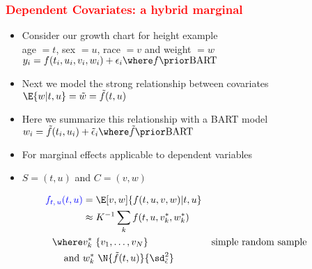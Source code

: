 \documentclass[11pt,dvipsnames,usenames,times]{beamer}
\newcommand*{\BART}{\mathrm{BART}\ }
\newcommand*{\red}[1]{\textcolor{red}{#1}}%
\begin{document}
\begin{frame}\frametitle{\bf%
\textcolor{red}{Dependent Covariates: a hybrid marginal}}

\begin{itemize}
\item Consider our growth chart for height example\\
age $=t$, sex $=u$, race $=v$ and weight $=w$\\
$y_i = f(t_i, u_i, v_i, w_i) + \epsilon_i \where f \prior \BART$
\item Next we model the strong relationship between covariates\\
  $\E{w|t, u}=\tilde{w}=\tilde{f}(t, u)$
\item Here we summarize this relationship with a BART model
$w_i=\tilde{f}(t_i, u_i)+\tilde{\epsilon}_i \where \tilde{f} \prior \BART$
\item For marginal effects applicable to dependent variables
\item $S=(t, u)$ and $C=(v, w)$
\end{itemize}
\begin{align*}
\textcolor{blue}{f_{t,\,u}(t, u)}&=\E[v,w]{f(t, u, v, w)|t, u} \\ %
&\approx K^{-1} \sum_k f(t, u, v^*_k, {w}^*_k) \\ %
\where& v^*_k ~ \{v_1, \dots, v_N\} & & \mbox{simple random sample} \\
\mbox{and\ }& {w}^*_k ~ \N{\tilde{f}(t, u)}{\sd^2_{\tilde{\epsilon}}}  
\end{align*}

\end{frame}
\end{document}

